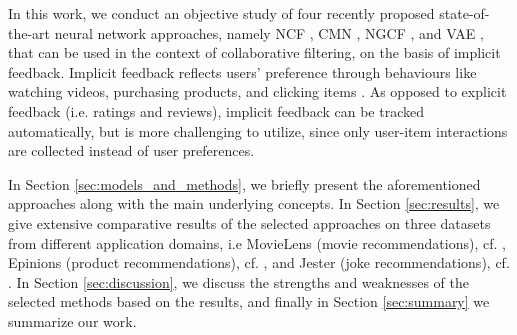 In this work, we conduct an objective study of four recently proposed state-of-the-art neural network approaches, namely NCF \cite{he2017neural}, CMN \cite{ebesu2018collaborative}, NGCF \cite{wang2019neural}, and VAE \cite{liang2018variational}, that can be used in the context of collaborative filtering, on the basis of implicit feedback.
Implicit feedback reflects users' preference through behaviours like watching videos, purchasing products, and clicking items \cite{hu2008collaborative}.
As opposed to explicit feedback (i.e. ratings and reviews), implicit feedback can be tracked automatically, but is more challenging to utilize, since only user-item interactions are collected instead of user preferences.

In Section \ref{sec:models_and_methods}, we briefly present the aforementioned approaches along with the main underlying concepts.
In Section \ref{sec:results}, we give extensive comparative results of the selected approaches on three datasets from different application domains, i.e MovieLens (movie recommendations), cf. \cite{harper2016movielens}, Epinions (product recommendations), cf. \cite{epinions}, and Jester (joke recommendations), cf. \cite{jester}.
In Section \ref{sec:discussion}, we discuss the strengths and weaknesses of the selected methods based on the results, and finally in Section \ref{sec:summary} we summarize our work.

